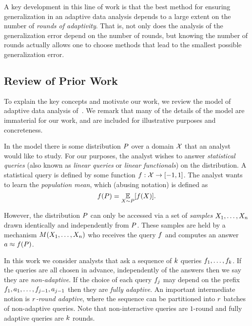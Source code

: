 A key development in this line of work is that the best method for ensuring generalization in an adaptive data analysis depends to a large extent on the number of \emph{rounds of adaptivity}.  That is, not only does the analysis of the generalization error depend on the number of rounds, but knowing the number of rounds actually allows one to choose methods that lead to the smallest possible generalization error.

\subsection{Review of Prior Work}

To explain the key concepts and motivate our work, we review the model of adaptive data analysis of~\cite{DworkFHPRR15,HU14}.  We remark that many of the details of the model are immaterial for our work, and are included for illustrative purposes and concreteness.  

In the model there is some distribution $P$ over a domain $\mathcal{X}$ that an analyst would like to study.  For our purposes, the analyst wishes to answer \emph{statistical queries} (also known as \emph{linear queries} or \emph{linear functionals}) on the distribution.  A statistical query is defined by some function $f : \mathcal{X} \to [-1,1]$.  The analyst wants to learn the \emph{population mean}, which (abusing notation) is defined as $$\query(\dist) = \ex{\sample \sim \dist}{\query(\sample)}.$$

However, the distribution $P$ can only be accessed via a set of \emph{samples} $X_1,\dots,X_n$ drawn identically and independently from $P$.  These samples are held by a mechanism $M(X_1,\dots,X_n)$ who receives the query $f$ and computes an answer $a \approx f(P)$.

In this work we consider analysts that ask a sequence of $k$ queries $f_1,\dots,f_k$.  If the queries are all chosen in advance, independently of the answers then we say they are \emph{non-adaptive}.  If the choice of each query $f_j$ may depend on the prefix $f_1,a_1,\dots,f_{j-1},a_{j-1}$ then they are \emph{fully adaptive}.  An important intermediate notion is \emph{$r$-round adaptive}, where the sequence can be partitioned into $r$ batches of non-adaptive queries.  Note that non-interactive queries are $1$-round and fully adaptive queries are $k$ rounds.


